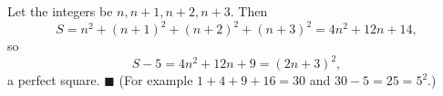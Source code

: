 Let the integers be $n,n+1,n+2,n+3$. Then
\[S=n^2+(n+1)^2+(n+2)^2+(n+3)^2=4n^2+12n+14,\]
so
\[S-5=4n^2+12n+9=(2n+3)^2,\]
a perfect square. $\blacksquare$ (For example $1+4+9+16=30$ and $30-5=25=5^2$.)
